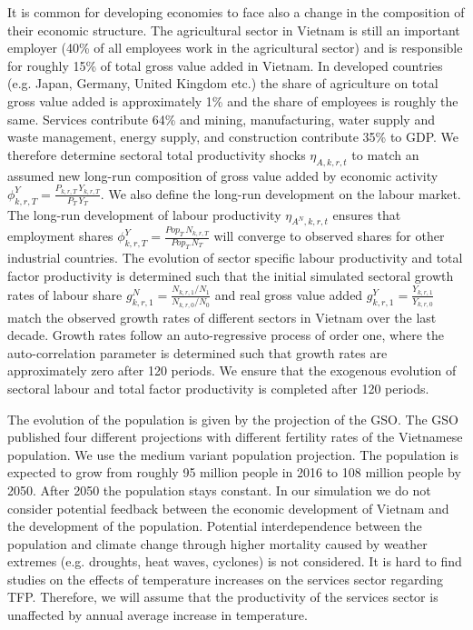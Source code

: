 \documentclass[10pt,a4paper]{article}
\begin{document}
It is common for developing economies to face also a change in the composition of their economic structure. The agricultural sector in Vietnam is still an important employer (40\% of all employees work in the agricultural sector) and is responsible for roughly 15\% of total gross value added in Vietnam. In developed countries (e.g. Japan, Germany, United Kingdom etc.) the share of agriculture on total gross value added is approximately 1\% and the share of employees is roughly the same. Services contribute 64\% and mining, manufacturing, water supply and waste management, energy supply, and construction contribute 35\% to GDP. We therefore determine sectoral total productivity shocks $\eta_{A,k,r,t}$ to match an assumed new long-run composition of gross value added by economic activity $\phi^{Y}_{k,r,T} = \frac{P_{k,r,T} \, Y_{k,r,T}}{P_{T} \, Y_{T}}$. We also define the long-run development on the labour market. The long-run development of labour productivity $\eta_{A^{N},k,r,t}$ ensures that employment shares $\phi^{Y}_{k,r,T} = \frac{Pop_{T} \, N_{k,r,T}}{Pop_{T} \, N_{T}}$ will converge to observed shares for other industrial countries. The evolution of sector specific labour productivity and total factor productivity is determined such that the initial simulated sectoral growth rates of labour share $g^{N}_{k,r,1} = \frac{N_{k,r,1}/N_{1}}{N_{k,r,0}/N_{0}}$ and real gross value added $g^{Y}_{k,r,1} = \frac{Y_{k,r,1}}{Y_{k,r,0}}$ match the observed growth rates of different sectors in Vietnam over the last decade. Growth rates follow an auto-regressive process of order one, where the auto-correlation parameter is determined such that growth rates are approximately zero after 120 periods. We ensure that the exogenous evolution of sectoral labour and total factor productivity is completed after 120 periods.

The evolution of the population is given by the projection of the GSO. The GSO published four different projections with different fertility rates of the Vietnamese population. We use the medium variant population projection. The population is expected to grow from roughly 95 million people in 2016 to 108 million people by 2050. After 2050 the population stays constant. In our simulation we do not consider potential feedback between the economic development of Vietnam and the development of the population. Potential interdependence between the population and climate change through higher mortality caused by weather extremes (e.g. droughts, heat waves, cyclones) is not considered. It is hard to find studies on the effects of temperature increases on the services sector regarding TFP. Therefore, we will assume that the productivity of the services sector is unaffected by annual average increase in temperature.
\end{document}
